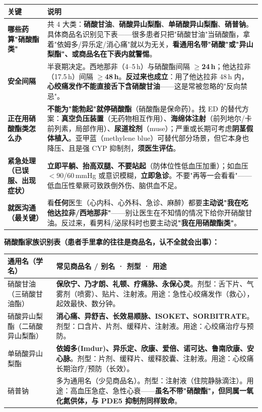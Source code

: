 \documentclass[12pt,UTF8,openany]{ctexbook}
\begin{document}
\begin{tabularx}{\textwidth}{l X}
\toprule
\textbf{关键} & \textbf{说明} \\
\midrule
\textbf{哪些药算"硝酸酯类"} & 共 4 大类：\textbf{硝酸甘油}、\textbf{硝酸异山梨酯}、\textbf{单硝酸异山梨酯}、\textbf{硝普钠}。具体商品名识别见下表——很多患者只把"硝酸甘油"当硝酸酯，拿着"依姆多/异乐定/消心痛"就以为无关，\textbf{看通用名带"硝酸"或"异山梨酯"、或商品名在下表内就警惕}。 \\
\textbf{安全间隔} & 半衰期决定。西地那非（4--5\,h）与硝酸酯间隔\textbf{ $\ge$24\,h}；他达拉非（17.5\,h）间隔\textbf{ $\ge$48\,h}。\textbf{反过来也成立}：用了他达拉非 48\,h 内，\textbf{心绞痛发作不能直接舌下含硝酸甘油}——这是常被忽略的"反向禁忌"。 \\
\textbf{正在用硝酸酯类怎么办} & \textbf{不能为"能勃起"就停硝酸酯}（硝酸酯是保命药）。找 ED 的替代方案：\textbf{真空负压装置}（无药物相互作用）、\textbf{海绵体注射}（前列地尔/卡前列素，局部作用）、\textbf{尿道栓剂}（muse）；严重或长期可考虑\textbf{阴茎假体植入}。亚甲蓝（methylene blue）可替代部分场景，但它本身也降压、且是强 CYP 抑制剂，\textbf{须医生评估}。 \\
\textbf{紧急处理（已误服、出现症状）} & \textbf{立即平躺、抬高双腿、不要站起}（防体位性低血压加重）；如血压 $<$90/60\,mmHg 或意识模糊，\textbf{立即急诊}。不要"再等一会看看"——低血压性晕厥可致跌倒外伤、脑供血不足。 \\
\textbf{就医沟通（最关键）} & 看\textbf{任何}医生（心内科、心外科、急诊、麻醉）都要\textbf{主动说"我在吃他达拉非/西地那非"}——别让医生在不知情的情况下给你开硝酸甘油。反过来，看男科/泌尿科时也要主动说\textbf{"我在用硝酸酯类"}。 \\
\bottomrule
\end{tabularx}

\textbf{硝酸酯家族识别表（患者手里拿的往往是商品名，认不全就会出事）：}

\begin{tabularx}{\textwidth}{p{3.6cm} X}
\toprule
\textbf{通用名（学名）} & \textbf{常见商品名 / 别名 · 剂型 · 用途} \\
\midrule
硝酸甘油（三硝酸甘油酯） & \textbf{保欣宁、乃才朗、礼顿、疗痛脉、永保心灵}。剂型：舌下片、气雾剂（喷雾）、贴片、注射液。用途：急性心绞痛发作（救心），起效最快、数分钟。 \\
硝酸异山梨酯（二硝酸异山梨酯） & \textbf{消心痛、异舒吉、长效易顺脉、ISOKET、SORBITRATE}。剂型：口含片、片剂、缓释片、注射液。用途：心绞痛治疗与预防。 \\
单硝酸异山梨酯 & \textbf{依姆多(Imdur)、异乐定、欣康、爱倍、诺可达、鲁南欣康、安心脉}。剂型：片剂、缓释片、缓释胶囊、注射液。用途：心绞痛长期治疗/预防（长效）。 \\
硝普钠 & 多为通用名（少见商品名）。剂型：注射液（住院静脉滴注）。用途：高血压急症、急性心衰——\textbf{虽名不带"硝酸酯"，但同属一氧化氮供体，与 PDE5 抑制剂同样致命}。 \\
\bottomrule
\end{tabularx}
\end{document}
